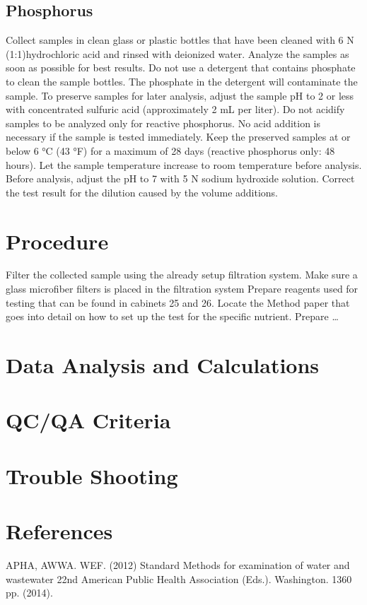 \documentclass[12pt]{../SOP4_alpha}\usepackage[]{graphicx}\usepackage[]{xcolor}
\begin{document}
\subsection{Phosphorus}
\NP Collect samples in clean glass or plastic bottles that have been cleaned with 6 N (1:1)hydrochloric acid and rinsed with deionized water.
\NP Analyze the samples as soon as possible for best results.
\NP Do not use a detergent that contains phosphate to clean the sample bottles. The
phosphate in the detergent will contaminate the sample.
\NP To preserve samples for later analysis, adjust the sample pH to 2 or less with
concentrated sulfuric acid (approximately 2 mL per liter). Do not acidify samples to be analyzed only for reactive phosphorus. No acid addition is necessary if the sample is tested immediately.
\NP Keep the preserved samples at or below 6 °C (43 °F) for a maximum of 28 days
(reactive phosphorus only: 48 hours). 
\NP Let the sample temperature increase to room temperature before analysis.
\NP Before analysis, adjust the pH to 7 with 5 N sodium hydroxide solution.
\NP Correct the test result for the dilution caused by the volume additions. 

\section{Procedure}
\NP Filter the collected sample using the already setup filtration system.
\NP Make sure a glass microfiber filters is placed in the filtration system
\NP Prepare reagents used for testing that can be found in cabinets 25 and 26.
\NP Locate the Method paper that goes into detail on how to set up the test for the 
specific nutrient.
\NP Prepare \dots

\section{Data Analysis and Calculations}

\section{QC/QA Criteria}

\section{Trouble Shooting}

\section{References}

\NP APHA, AWWA. WEF. (2012) Standard Methods for examination of water and wastewater 22nd American Public Health Association (Eds.). Washington. 1360 pp. (2014).
\end{document}
